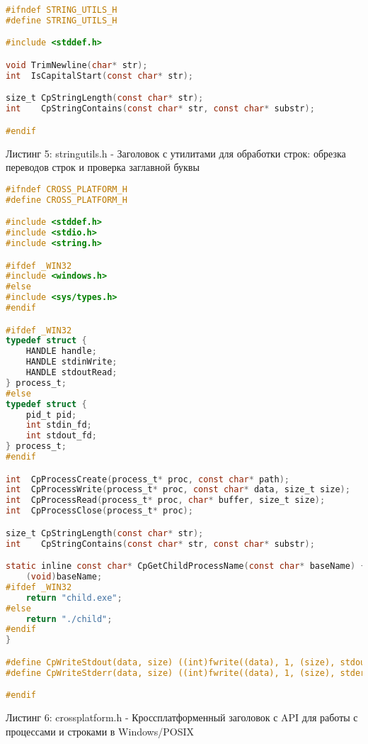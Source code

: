 \begin{lstlisting}[language=C]
#ifndef STRING_UTILS_H
#define STRING_UTILS_H

#include <stddef.h>

void TrimNewline(char* str);
int  IsCapitalStart(const char* str);

size_t CpStringLength(const char* str);
int    CpStringContains(const char* str, const char* substr);

#endif
\end{lstlisting}
Листинг 5: stringutils.h - Заголовок с утилитами для обработки строк: обрезка переводов строк и проверка заглавной буквы

\begin{lstlisting}[language=C]
#ifndef CROSS_PLATFORM_H
#define CROSS_PLATFORM_H

#include <stddef.h>
#include <stdio.h>
#include <string.h>

#ifdef _WIN32
#include <windows.h>
#else
#include <sys/types.h>
#endif

#ifdef _WIN32
typedef struct {
    HANDLE handle;
    HANDLE stdinWrite;
    HANDLE stdoutRead;
} process_t;
#else
typedef struct {
    pid_t pid;
    int stdin_fd;
    int stdout_fd;
} process_t;
#endif

int  CpProcessCreate(process_t* proc, const char* path);
int  CpProcessWrite(process_t* proc, const char* data, size_t size);
int  CpProcessRead(process_t* proc, char* buffer, size_t size);
int  CpProcessClose(process_t* proc);

size_t CpStringLength(const char* str);
int    CpStringContains(const char* str, const char* substr);

static inline const char* CpGetChildProcessName(const char* baseName) {
    (void)baseName;
#ifdef _WIN32
    return "child.exe";
#else
    return "./child";
#endif
}

#define CpWriteStdout(data, size) ((int)fwrite((data), 1, (size), stdout))
#define CpWriteStderr(data, size) ((int)fwrite((data), 1, (size), stderr))

#endif
\end{lstlisting}
Листинг 6: crossplatform.h - Кроссплатформенный заголовок с API для работы с процессами и строками в Windows/POSIX
